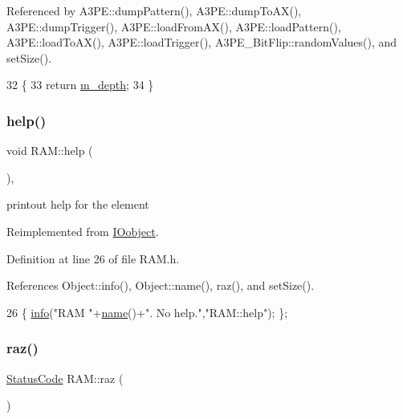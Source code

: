 Referenced by A3\+P\+E\+::dump\+Pattern(), A3\+P\+E\+::dump\+To\+A\+X(), A3\+P\+E\+::dump\+Trigger(), A3\+P\+E\+::load\+From\+A\+X(), A3\+P\+E\+::load\+Pattern(), A3\+P\+E\+::load\+To\+A\+X(), A3\+P\+E\+::load\+Trigger(), A3\+P\+E\+\_\+\+Bit\+Flip\+::random\+Values(), and set\+Size().


\begin{DoxyCode}
32              \{
33     \textcolor{keywordflow}{return} \hyperlink{classRAM_a7f23b0ac79ae5d954c968814c628ac53}{m\_depth};
34   \}
\end{DoxyCode}
\mbox{\label{classRAM_ac1e78007fabee045f00f342a907fa25c}} 
\subsubsection{\texorpdfstring{help()}{help()}}
{\footnotesize\ttfamily void R\+A\+M\+::help (\begin{DoxyParamCaption}{ }\end{DoxyParamCaption})\hspace{0.3cm}{\ttfamily [inline]}, {\ttfamily [virtual]}}

printout help for the element 

Reimplemented from \hyperlink{classIOobject_a0520d82a9773c764fbaede59fe6f8a17}{I\+Oobject}.



Definition at line 26 of file R\+A\+M.\+h.



References Object\+::info(), Object\+::name(), raz(), and set\+Size().


\begin{DoxyCode}
26 \{ \hyperlink{classObject_a644fd329ea4cb85f54fa6846484b84a8}{info}(\textcolor{stringliteral}{"RAM "}+\hyperlink{classObject_a300f4c05dd468c7bb8b3c968868443c1}{name}()+\textcolor{stringliteral}{". No help."},\textcolor{stringliteral}{"RAM::help"}); \};
\end{DoxyCode}
\mbox{\label{classRAM_aac835f84bf892cd4d95b5d7a0caa62f0}} 
\subsubsection{\texorpdfstring{raz()}{raz()}}
{\footnotesize\ttfamily \hyperlink{classStatusCode}{Status\+Code} R\+A\+M\+::raz (\begin{DoxyParamCaption}{ }\end{DoxyParamCaption})}



